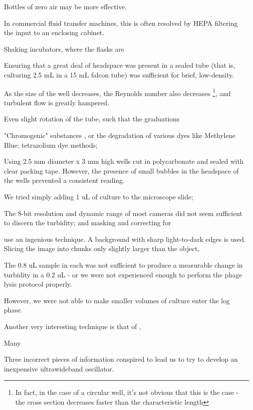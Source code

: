 \documentclass[paper.tex]{subfiles}
\begin{document}
Bottles of zero air may be more effective.

In commercial fluid transfer machines, this is often resolved by HEPA filtering the input to an enclosing cabinet.

Shaking incubators, where the flasks are 

Ensuring that a great deal of headspace was present in a sealed tube (that is, culturing 2.5 mL in a 15 mL falcon tube) was sufficient for brief, low-density.



As the size of the well decreases, the Reynolds number also decreases \footnote{In fact, in the case of a circular well, it's not obvious that this is the case - the cross section decreases faster than the characteristic length}, and turbulent flow is greatly hampered.

Even slight rotation of the tube, such that the graduations 

"Chromogenic" substances \cite{Fluorogenic1991}, or the degradation of various dyes like Methylene Blue; tetrazolium dye methods;

Using 2.5 mm diameter x 3 mm high wells cut in polycarbonate and sealed with clear packing tape. However, the presence of small bubbles in the headspace of the wells prevented a consistent reading.

We tried simply adding 1 uL of culture to the microscope slide;

The 8-bit resolution and dynamic range of most cameras did not seem sufficient to discern the turbidity; and masking and correcting for 

\cite{Vision2016} use an ingenious technique. A background with sharp light-to-dark edges is used. Slicing the image into chunks only slightly larger than the object,


The 0.8 uL sample in each was not sufficient to produce a measurable change in turbidity in a 0.2 uL - or we were not experienced enough to perform the phage lysis protocol properly.

However, we were not able to make smaller volumes of culture enter the log phase.




Another very interesting technique is that of \cite{Study2003}, 




Many 

Three incorrect pieces of information conspired to lead us to try to develop an inexpensive ultrawideband oscillator.
\end{document}
